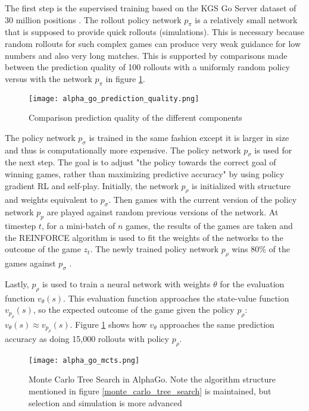 The first step is the supervised training based on the KGS Go Server dataset of 30 million positions \cite[p. 485]{silver_mastering_2016}. The rollout policy network $p_{\pi}$ is a relatively small network that is supposed to provide quick rollouts (simulations). This is necessary because random rollouts for such complex games can produce very weak guidance for low numbers and also very long matches. This is supported by comparisons made between the prediction quality of 100 rollouts with a uniformly random policy versus with the network $p_{\pi}$ in figure \ref{alpha_go_prediction_quality}.

\begin{figure}
    \centering
    \texttt{[image: alpha\_go\_prediction\_quality.png]}
    \caption{Comparison prediction quality of the different components \cite{silver_mastering_2016}}
    \label{alpha_go_prediction_quality}
\end{figure}

The policy network $p_{\sigma}$ is trained in the same fashion except it is larger in size and thus is computationally more expensive. The policy network $p_{\sigma}$ is used for the next step. The goal is to adjust "the policy towards the correct goal of winning games, rather than maximizing predictive accuracy" \cite[p.484]{silver_mastering_2016} by using policy gradient RL and self-play. Initially, the network $p_{\rho}$ is initialized with structure and weights equivalent to $p_{\sigma}$. Then games with the current version of the policy network $p_{p}$ are played against random previous versions of the network. At timestep $t$, for a mini-batch of $n$ games, the results of the games are taken and the REINFORCE algorithm \cite{williams_simple_1992} is used to fit the weights of the networks to the outcome of the game $z_t$. The newly trained policy network $p_{\rho}$ wins 80\% of the games against $p_{\sigma}$ \cite[p. 485]{silver_mastering_2016}.

Lastly, $p_{\rho}$ is used to train a neural network with weights $\theta$ for the evaluation function $v_{\theta}(s)$. This evaluation function approaches the state-value function $v_{p_{\rho}}(s)$, so the expected outcome of the game given the policy $p_{\rho}$: $v_{\theta}(s) \approx v_{p_{\rho}}(s)$. Figure \ref{alpha_go_prediction_quality} shows how $v_{\theta}$ approaches the same prediction accuracy as doing 15,000 rollouts with policy $p_{\rho}$.

\begin{figure}
    \centering
    \texttt{[image: alpha\_go\_mcts.png]}
    \caption{Monte Carlo Tree Search in AlphaGo. \cite{silver_mastering_2016} Note the algorithm structure mentioned in figure \ref{monte_carlo_tree_search} is maintained, but selection and simulation is more advanced}
    \label{alpha_go_mcts}
\end{figure}

